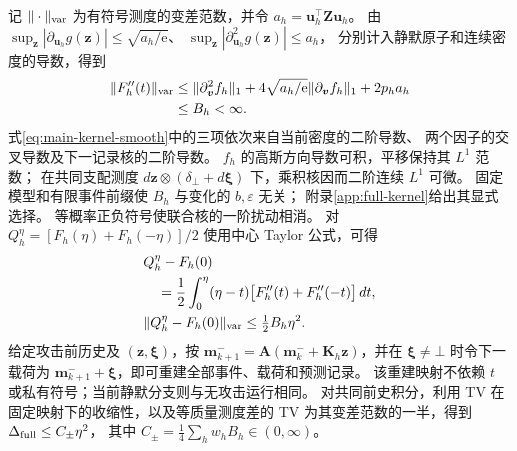 记 $\|\cdot\|_{\rm var}$ 为有符号测度的变差范数，并令 $a_h={\bm{u}}_h^\top {\bm{Z}}{\bm{u}}_h$。
由 $\sup_{\bm{z}}|\partial_{{\bm{u}}_h}g({\bm{z}})|\le\sqrt{a_h/\mathrm e}$、
$\sup_{\bm{z}}|\partial_{{\bm{u}}_h}^2g({\bm{z}})|\le a_h$，
分别计入静默原子和连续密度的导数，得到
\begin{equation}
 \begin{aligned}
 \|F_h''(t)\|_{\rm var}
 &\le \|\partial_{\bm{v}}^2 f_h\|_1
 +4\sqrt{a_h/\mathrm e}\|\partial_{\bm{v}} f_h\|_1
 +2p_ha_h\\
 &\le B_h<\infty.
 \end{aligned}
 \label{eq:main-kernel-smooth}
\end{equation}
式\eqref{eq:main-kernel-smooth}中的三项依次来自当前密度的二阶导数、
两个因子的交叉导数及下一记录核的二阶导数。
$f_h$ 的高斯方向导数可积，平移保持其 $L^1$ 范数；
在共同支配测度 $d{\bm{z}}\otimes(\delta_\bot+d{\bm{\xi}})$ 下，乘积核因而二阶连续 $L^1$ 可微。
固定模型和有限事件前缀使 $B_h$ 与变化的 $b,\varepsilon$ 无关；
附录\ref{app:full-kernel}给出其显式选择。
等概率正负符号使联合核的一阶扰动相消。
对 $Q_h^\eta=[F_h(\eta)+F_h(-\eta)]/2$ 使用中心 Taylor 公式，可得
\begin{equation}
 \begin{aligned}
 &Q_h^\eta-F_h(0)\\
 &\quad=\frac12\int_0^\eta(\eta-t)
 \bigl[F_h''(t)+F_h''(-t)\bigr]\,dt,\\
 &\|Q_h^\eta-F_h(0)\|_{\rm var}\le \tfrac12B_h\eta^2.
 \end{aligned}
 \label{eq:main-kernel-taylor}
\end{equation}
给定攻击前历史及 $({\bm{z}},{\bm{\xi}})$，按
${\bm{m}}_{k+1}^-={\bm{A}}({\bm{m}}_k^-+{\bm{K}}_h{\bm{z}})$，并在 ${\bm{\xi}}\ne\bot$ 时令下一载荷为
${\bm{m}}_{k+1}^-+{\bm{\xi}}$，即可重建全部事件、载荷和预测记录。
该重建映射不依赖 $t$ 或私有符号；当前静默分支则与无攻击运行相同。
对共同前史积分，利用 TV 在固定映射下的收缩性，以及等质量测度差的
TV 为其变差范数的一半，得到
$\Delta_{\rm full}\le C_\pm\eta^2$，
其中 $C_\pm=\frac14\sum_hw_hB_h\in(0,\infty)$。
